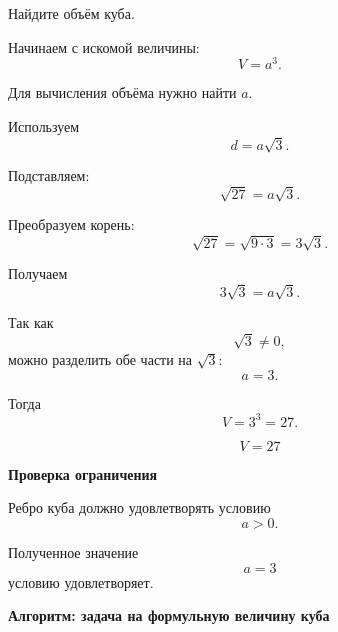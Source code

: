 \documentclass[a4paper,12pt]{article}
\newcommand{\subsectiontitle}[1]{%
    \vspace{0.4em}
    {\large\bfseries\color{darkaccent}#1}\par
    \vspace{0.2em}
}
\begin{document}
Найдите объём куба.

Начинаем с искомой величины:
\[
V=a^3.
\]

Для вычисления объёма нужно найти \(a\).

Используем
\[
d=a\sqrt3.
\]

Подставляем:
\[
\sqrt{27}=a\sqrt3.
\]

Преобразуем корень:
\[
\sqrt{27}
=
\sqrt{9\cdot3}
=
3\sqrt3.
\]

Получаем
\[
3\sqrt3=a\sqrt3.
\]

Так как
\[
\sqrt3\ne0,
\]
можно разделить обе части на \(\sqrt3\):
\[
a=3.
\]

Тогда
\[
V=3^3=27.
\]

\[
\boxed{V=27}
\]

\subsectiontitle{Проверка ограничения}

Ребро куба должно удовлетворять условию
\[
a>0.
\]

Полученное значение
\[
a=3
\]
условию удовлетворяет.

\clearpage
\thispagestyle{fancy}

\begin{center}

{\LARGE\bfseries\color{darkaccent}
Алгоритм: задача на формульную величину куба
}

\end{center}

\vspace{10mm}
\end{document}
